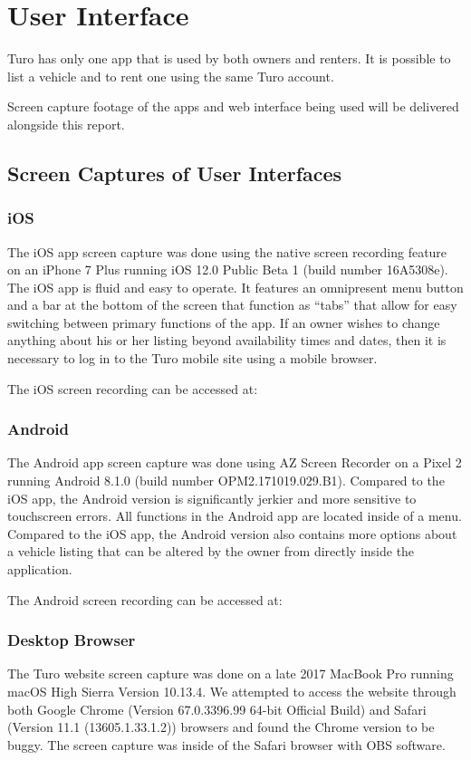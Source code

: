 \documentclass[review,12pt]{elsarticle}
\begin{document}
\section{User Interface}
Turo has only one app that is used by both owners and renters. It is possible to list a vehicle and to rent one using the same Turo account.

Screen capture footage of the apps and web interface being used will be delivered alongside this report.

\subsection{Screen Captures of User Interfaces}
  \subsubsection{iOS}
  The iOS app screen capture was done using the native screen recording feature on an iPhone 7 Plus running iOS 12.0 Public Beta 1 (build number 16A5308e). The iOS app is fluid and easy to operate. It features an omnipresent menu button and a bar at the bottom of the screen that function as ``tabs'' that allow for easy switching between primary functions of the app. If an owner wishes to change anything about his or her listing beyond availability times and dates, then it is necessary to log in to the Turo mobile site using a mobile browser.

  The iOS screen recording can be accessed at:

  \subsubsection{Android}
  The Android app screen capture was done using AZ Screen Recorder on a Pixel 2 running Android 8.1.0 (build number OPM2.171019.029.B1). Compared to the iOS app, the Android version is significantly jerkier and more sensitive to touchscreen errors. All functions in the Android app are located inside of a menu. Compared to the iOS app, the Android version also contains more options about a vehicle listing that can be altered by the owner from directly inside the application.

  The Android screen recording can be accessed at:

  \subsubsection{Desktop Browser}
  The Turo website screen capture was done on a late 2017 MacBook Pro running macOS High Sierra Version 10.13.4. We attempted to access the website through both Google Chrome (Version 67.0.3396.99 64-bit Official Build) and Safari (Version 11.1 (13605.1.33.1.2)) browsers and found the Chrome version to be buggy. The screen capture was inside of the Safari browser with OBS software.
\end{document}
